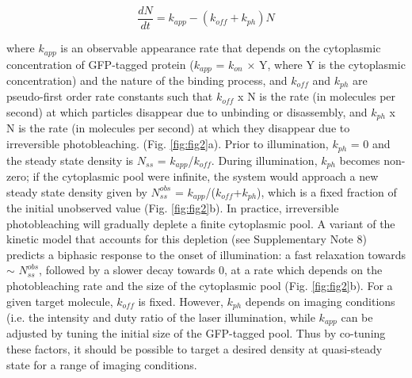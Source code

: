  \begin{equation}
 \frac{dN}{dt}=k_{app} - (k_{off} + k_{ph})N
 \end{equation}
 
 where $k_{app}$ is an observable appearance rate that depends on the cytoplasmic concentration of GFP-tagged protein ($k_{app}$ = $k_{on}$ × Y, where Y is the cytoplasmic concentration) and the nature of the binding process, and $k_{off}$ and $k_{ph}$ are pseudo-first order rate constants such that $k_{off}$ x N is the rate (in molecules per second) at which particles disappear due to unbinding or disassembly, and $k_{ph}$ x N is the rate (in molecules per second) at which they disappear due to irreversible photobleaching. (Fig. \ref{fig:fig2}a). Prior to illumination, $k_{ph}$ = 0 and the steady state density is $N_{ss}$ = $k_{app}$/$k_{off}$. During illumination, $k_{ph}$ becomes non-zero; if the cytoplasmic pool were infinite, the system would approach a new steady state density given by $N_{ss}^{obs}$ = $k_{app}$/($k_{off}$+$k_{ph}$), which is a fixed fraction of the initial unobserved value (Fig. \ref{fig:fig2}b). In practice, irreversible photobleaching will gradually deplete a finite cytoplasmic pool. A variant of the kinetic model that accounts for this depletion (see Supplementary Note 8) predicts a biphasic response to the onset of illumination: a fast relaxation towards $\sim$ $N_{ss}^{obs}$, followed by a slower decay towards 0, at a rate which depends on the photobleaching rate and the size of the cytoplasmic pool (Fig. \ref{fig:fig2}b). For a given target molecule, $k_{off}$ is fixed. However, $k_{ph}$ depends on imaging conditions (i.e. the intensity and duty ratio of the laser illumination, while $k_{app}$ can be adjusted by tuning the initial size of the GFP-tagged pool. Thus by co-tuning these factors, it should be possible to target a desired density at quasi-steady state for a range of imaging conditions.
 
 
 
